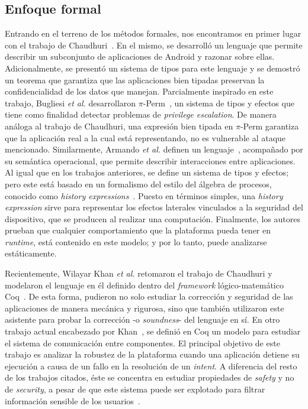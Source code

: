 \subsection*{Enfoque formal}
Entrando en el terreno de los métodos formales, nos encontramos en primer lugar
con el trabajo de Chaudhuri~\cite{chaudhuri}. En el mismo, se desarrolló un
lenguaje que permite describir un subconjunto de aplicaciones de Android y
razonar sobre ellas. Adicionalmente, se presentó un sistema de tipos para este
lenguaje y se demostró un teorema que garantiza que las aplicaciones bien
tipadas preservan la confidencialidad de los datos que manejan. Parcialmente
inspirado en este trabajo, Bugliesi \textit{et al.} desarrollaron
$\pi$-Perm~\cite{bugliesi}, un sistema de tipos y efectos que tiene como
%
%
finalidad detectar problemas de \textit{privilege escalation}. De manera análoga
al trabajo de Chaudhuri, una expresión bien tipada en $\pi$-Perm garantiza que
la aplicación real a la cual está representando, no es vulnerable al ataque
mencionado. Similarmente, Armando \textit{et al.} definen un
lenguaje~\cite{armando}, acompañado por su semántica operacional, que permite
describir interacciones entre aplicaciones. Al igual que en los trabajos
anteriores, se define un sistema de tipos y efectos; pero este está basado en un
formalismo del estilo del álgebra de procesos, conocido como \textit{history
expressions}~\cite{history-expressions}. Puesto en términos simples, una
\textit{history expression} sirve para representar los efectos laterales
vinculados a la seguridad del dispositivo, que se producen al realizar una
computación. Finalmente, los autores prueban que cualquier comportamiento que la
plataforma pueda tener en \textit{runtime}, está contenido en este modelo; y por
lo tanto, puede analizarse estáticamente.

Recientemente, Wilayar Khan \textit{et al.} retomaron el trabajo de Chaudhuri y
modelaron el lenguaje en él definido dentro del \textit{framework}
lógico-matemático Coq~\cite{coq}. De esta forma, pudieron no solo estudiar la
corrección y seguridad de las aplicaciones de manera mecánica y rigurosa, sino
que también utilizaron este asistente para probar la corrección -o
\textit{soundness}- del lenguaje en sí. En otro trabajo actual encabezado por
Khan~\cite{crashsafe}, se definió en Coq un modelo para estudiar el sistema de
comunicación entre componentes. El principal objetivo de este trabajo es
analizar la robustez de la plataforma cuando una aplicación detiene su ejecución
a causa de un fallo en la resolución de un \textit{intent}. A diferencia del
resto de los trabajos citados, éste se concentra en estudiar propiedades de
\textit{safety} y no de \textit{security}, a pesar de que este sistema puede ser
explotado para filtrar información sensible de los usuarios~\cite{iccta}.

